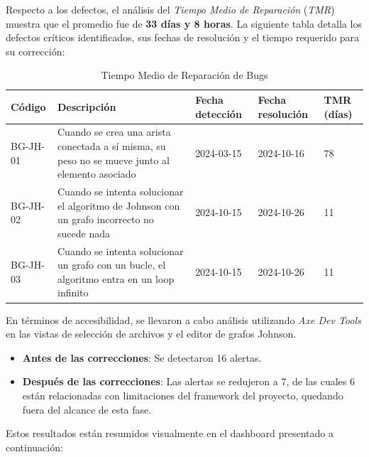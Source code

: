 \documentclass[stu, 12pt, letterpaper, donotrepeattitle, floatsintext, natbib]{apa7}
\begin{document}
\noindent Respecto a los defectos, el análisis del \textit{Tiempo Medio de Reparación} (\textit{TMR}) muestra que el promedio fue de \textbf{33 días y 8 horas}. La siguiente tabla detalla los defectos críticos identificados, sus fechas de resolución y el tiempo requerido para su corrección:  


\begin{table}[H]
    \caption{Tiempo Medio de Reparación de Bugs}
    \centering
    \begin{tabularx}{\textwidth}{|l|X|l|l|l|}
        \hline
        \textbf{Código} & \textbf{Descripción} & \textbf{Fecha detección} & \textbf{Fecha resolución} & \textbf{TMR (días)} \\ \hline
        BG-JH-01 & Cuando se crea una arista conectada a sí misma, su peso no se mueve junto al elemento asociado & 2024-03-15 & 2024-10-16 & 78 \\ \hline
        BG-JH-02 & Cuando se intenta solucionar el algoritmo de Johnson con un grafo incorrecto no sucede nada & 2024-10-15 & 2024-10-26 & 11 \\ \hline
        BG-JH-03 & Cuando se intenta solucionar un grafo con un bucle, el algoritmo entra en un loop infinito & 2024-10-15 & 2024-10-26 & 11 \\ \hline
    \end{tabularx}
\end{table}

\noindent En términos de accesibilidad, se llevaron a cabo análisis utilizando \textit{Axe Dev Tools} en las vistas de selección de archivos y el editor de grafos Johnson.  

\begin{itemize}
    \item \textbf{Antes de las correcciones}: Se detectaron 16 alertas.  
    \item \textbf{Después de las correcciones}: Las alertas se redujeron a 7, de las cuales 6 están relacionadas con limitaciones del framework del proyecto, quedando fuera del alcance de esta fase.  
\end{itemize}

\noindent Estos resultados están resumidos visualmente en el dashboard presentado a continuación:  
\end{document}
